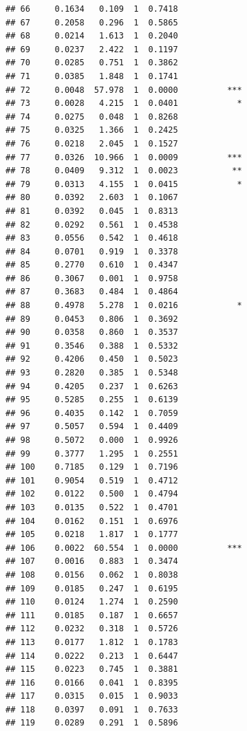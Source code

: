 \documentclass[
]{article}
\begin{document}
\begin{verbatim}
## 66     0.1634   0.109  1  0.7418             
## 67     0.2058   0.296  1  0.5865             
## 68     0.0214   1.613  1  0.2040             
## 69     0.0237   2.422  1  0.1197             
## 70     0.0285   0.751  1  0.3862             
## 71     0.0385   1.848  1  0.1741             
## 72     0.0048  57.978  1  0.0000          ***
## 73     0.0028   4.215  1  0.0401            *
## 74     0.0275   0.048  1  0.8268             
## 75     0.0325   1.366  1  0.2425             
## 76     0.0218   2.045  1  0.1527             
## 77     0.0326  10.966  1  0.0009          ***
## 78     0.0409   9.312  1  0.0023           **
## 79     0.0313   4.155  1  0.0415            *
## 80     0.0392   2.603  1  0.1067             
## 81     0.0392   0.045  1  0.8313             
## 82     0.0292   0.561  1  0.4538             
## 83     0.0556   0.542  1  0.4618             
## 84     0.0701   0.919  1  0.3378             
## 85     0.2770   0.610  1  0.4347             
## 86     0.3067   0.001  1  0.9758             
## 87     0.3683   0.484  1  0.4864             
## 88     0.4978   5.278  1  0.0216            *
## 89     0.0453   0.806  1  0.3692             
## 90     0.0358   0.860  1  0.3537             
## 91     0.3546   0.388  1  0.5332             
## 92     0.4206   0.450  1  0.5023             
## 93     0.2820   0.385  1  0.5348             
## 94     0.4205   0.237  1  0.6263             
## 95     0.5285   0.255  1  0.6139             
## 96     0.4035   0.142  1  0.7059             
## 97     0.5057   0.594  1  0.4409             
## 98     0.5072   0.000  1  0.9926             
## 99     0.3777   1.295  1  0.2551             
## 100    0.7185   0.129  1  0.7196             
## 101    0.9054   0.519  1  0.4712             
## 102    0.0122   0.500  1  0.4794             
## 103    0.0135   0.522  1  0.4701             
## 104    0.0162   0.151  1  0.6976             
## 105    0.0218   1.817  1  0.1777             
## 106    0.0022  60.554  1  0.0000          ***
## 107    0.0016   0.883  1  0.3474             
## 108    0.0156   0.062  1  0.8038             
## 109    0.0185   0.247  1  0.6195             
## 110    0.0124   1.274  1  0.2590             
## 111    0.0185   0.187  1  0.6657             
## 112    0.0232   0.318  1  0.5726             
## 113    0.0177   1.812  1  0.1783             
## 114    0.0222   0.213  1  0.6447             
## 115    0.0223   0.745  1  0.3881             
## 116    0.0166   0.041  1  0.8395             
## 117    0.0315   0.015  1  0.9033             
## 118    0.0397   0.091  1  0.7633             
## 119    0.0289   0.291  1  0.5896             

\end{verbatim}
\end{document}

